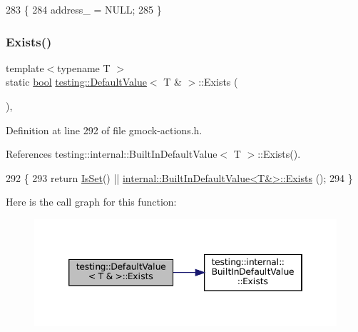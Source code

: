 \begin{DoxyCode}
283                       \{
284     address\_ = NULL;
285   \}
\end{DoxyCode}
\mbox{\label{classtesting_1_1DefaultValue_3_01T_01_6_01_4_a38420499e17d2fb4146ae6c4265f0d55}} 
\subsubsection{\texorpdfstring{Exists()}{Exists()}}
{\footnotesize\ttfamily template$<$typename T $>$ \\
static \hyperlink{classbool}{bool} \hyperlink{classtesting_1_1DefaultValue}{testing\+::\+Default\+Value}$<$ T \& $>$\+::Exists (\begin{DoxyParamCaption}{ }\end{DoxyParamCaption})\hspace{0.3cm}{\ttfamily [inline]}, {\ttfamily [static]}}



Definition at line 292 of file gmock-\/actions.\+h.



References testing\+::internal\+::\+Built\+In\+Default\+Value$<$ T $>$\+::\+Exists().


\begin{DoxyCode}
292                        \{
293     \textcolor{keywordflow}{return} \hyperlink{classtesting_1_1DefaultValue_ad49febe2c944cbbd06451ba7d0366ca1}{IsSet}() || \hyperlink{classtesting_1_1internal_1_1BuiltInDefaultValue_a35207bc20a493b0efb3980eb9a08dd2f}{internal::BuiltInDefaultValue<T&>::Exists}
      ();
294   \}
\end{DoxyCode}
Here is the call graph for this function\+:
\nopagebreak
\begin{figure}[H]
\begin{center}
\leavevmode
\includegraphics[width=346pt]{classtesting_1_1DefaultValue_3_01T_01_6_01_4_a38420499e17d2fb4146ae6c4265f0d55_cgraph}
\end{center}
\end{figure}
\mbox{\label{classtesting_1_1DefaultValue_3_01T_01_6_01_4_a1310448dd8c171aecfcbf7c8df5de7bd}} 
